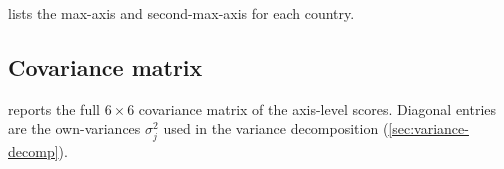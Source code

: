  lists the max-axis and second-max-axis for
each country.



\clearpage
\subsection{Covariance matrix}

 reports the full $6 \times 6$ covariance matrix
of the axis-level scores.  Diagonal entries are the own-variances
$\sigma_j^2$ used in the variance decomposition
(\cref{sec:variance-decomp}).


